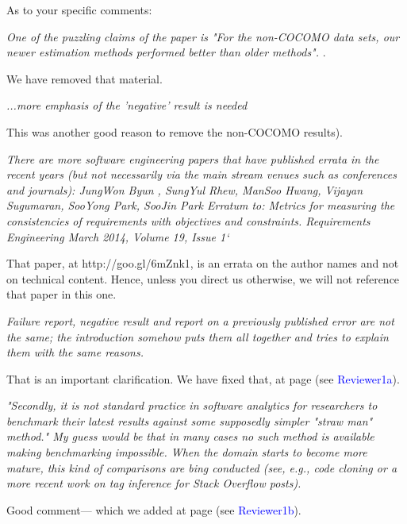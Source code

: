 \documentclass[smallcondesed]{svjour3}
\begin{document}
As to your specific comments: 
 
{\em One of the puzzling claims of the paper is "For the non-COCOMO data sets, our newer estimation methods performed better than older methods". }. 

We have removed
that material.

{\em ...more emphasis of the 'negative' result is needed}

This was another good reason to remove the
non-COCOMO results).

{\em There are more software engineering papers that have published errata in the recent years (but not necessarily via the main stream venues such as conferences and journals): JungWon Byun , SungYul Rhew, ManSoo Hwang, Vijayan Sugumaran, SooYong Park, SooJin Park Erratum to: Metrics for measuring the consistencies of requirements with objectives and constraints. Requirements Engineering March 2014, Volume 19, Issue 1`}

That paper, at http://goo.gl/6mZnk1,
is an errata on the author names
and not on technical content. Hence, unless you direct us otherwise,
we will not reference that paper in this one.

{\em Failure report, negative result and report on a previously published error are not the same; the introduction somehow puts them all together and tries to explain them with the same reasons.}

\newcommand{\WHERE}[1]{page \pageref{err:#1} (see \textcolor{blue}{#1})}

\newcommand{\HERE}[1]{\label{err:#1}
 \reversemarginpar\marginnote{\textcolor{blue}{(#1)}}}

That is an  important clarification.
We have fixed that, at \WHERE{Reviewer1a}.

{\em "Secondly, it is not standard practice in software analytics for researchers to benchmark their latest results against some supposedly simpler "straw man" method." My guess would be that in many cases no such method is available making benchmarking impossible. When the domain starts to become more mature, this kind of comparisons are bing conducted (see, e.g., code cloning or a more recent work on tag inference for Stack Overflow posts).}

Good comment--- which we added
at \WHERE{Reviewer1b}.
\end{document}
